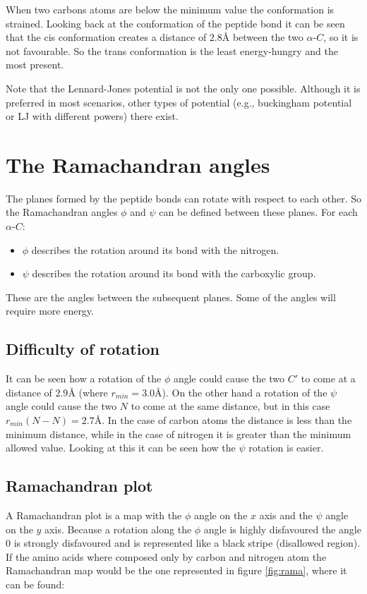 	When two carbons atoms are below the minimum value the conformation is strained.
	Looking back at the conformation of the peptide bond it can be seen that the cis conformation creates a distance of $2.8\si{\angstrom}$ between the two $\alpha$-$C$, so it is not favourable.
	So the trans conformation is the least energy-hungry and the most present.

	Note that the Lennard-Jones potential is not the only one possible.
	Although it is preferred in most scenarios, other types of potential (e.g., buckingham potential or LJ with different powers) there exist.

\section{The Ramachandran angles}
The planes formed by the peptide bonds can rotate with respect to each other.
So the Ramachandran angles $\phi$ and $\psi$ can be defined between these planes.
For each $\alpha$-$C$:

\begin{multicols}{2}
	\begin{itemize}
		\item $\phi$ describes the rotation around its bond with the nitrogen.
		\item $\psi$ describes the rotation around its bond with the carboxylic group.
	\end{itemize}
\end{multicols}

These are the angles between the subsequent planes.
Some of the angles will require more energy.

	\subsection{Difficulty of rotation}
	It can be seen how a rotation of the $\phi$ angle could cause the two $C'$ to come at a distance of $2.9\si{\angstrom}$ (where $r_{min} = 3.0\si{\angstrom}$).
	On the other hand a rotation of the $\psi$ angle could cause the two $N$ to come at the same distance, but in this case $r_{min}(N-N) = 2.7\si{\angstrom}$.
	In the case of carbon atoms the distance is less than the minimum distance, while in the case of nitrogen it is greater than the minimum allowed value.
	Looking at this it can be seen how the $\psi$ rotation is easier.

	\subsection{Ramachandran plot}
	A Ramachandran plot is a map with the $\phi$ angle on the $x$ axis and the $\psi$ angle on the $y$ axis.
	Because a rotation along the $\phi$ angle is highly disfavoured the angle $0$ is strongly disfavoured and is represented like a black stripe (disallowed region).
	If the amino acids where composed only by carbon and nitrogen atom the Ramachandran map would be the one represented in figure \ref{fig:rama}, where it can be found:

